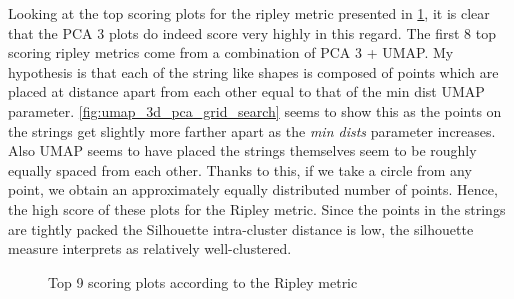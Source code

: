 \documentclass[a4paper, 12pt, twoside]{report}
\begin{document}
Looking at the top scoring plots for the ripley metric presented in \ref{fig:top_ripley}, it is clear that the PCA 3 plots do indeed score very highly in this regard. The first 8 top scoring ripley metrics come from a combination of PCA 3 + UMAP. My hypothesis is that each of the string like shapes is composed of points which are placed at distance apart from each other equal to that of the min dist UMAP parameter. \ref{fig:umap_3d_pca_grid_search} seems to show this as the points on the strings get slightly more farther apart as the \textit{min dists} parameter increases. Also UMAP seems to have placed the strings themselves seem to be roughly equally spaced from each other. Thanks to this, if we take a circle from any point, we obtain an approximately equally distributed number of points. Hence, the high score of these plots for the Ripley metric. Since the points in the strings are tightly packed the Silhouette intra-cluster distance is low, the silhouette measure interprets as relatively well-clustered.

\begin{figure}[h!tbp]
\centering
{}
\caption{Top 9 scoring plots according to the Ripley metric}
\label{fig:top_ripley}
\end{figure}
\end{document}
